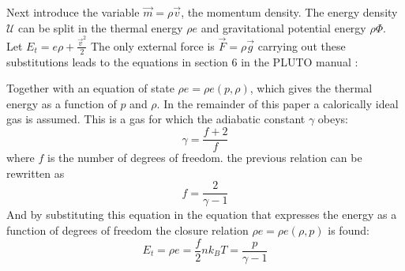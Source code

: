 Next introduce the variable $\vec{m}=\rho \vec{v}$, the momentum density. The energy density $\mathcal{U}$ can be split in the thermal energy $\rho e$ and gravitational potential energy $\rho\Phi$. Let $E_t = e\rho + \frac{\vec{v}^2}{2}$ The only external force is $\vec{F} = \rho\vec{g}$
carrying out these substitutions leads to the equations in section 6 in the PLUTO manual \cite{pluto-manual}: 

{\centering 
\noindent {}
\par}

Together with an equation of state $\rho e = \rho e(p, \rho)$, which gives the thermal energy as a function of $p$ and $\rho$.
In the remainder of this paper a calorically ideal gas is assumed. This is a gas for which the adiabatic constant $\gamma$ obeys:
\begin{equation}
	\gamma = \frac{f+2}{f}
	\label{eq:adiabatic constant}
\end{equation}
where $f$ is the number of degrees of freedom. the previous relation can be rewritten as
\begin{equation*}
	f = \frac{2}{\gamma-1}
\end{equation*}
And by substituting this equation in the equation that expresses the energy as a function of degrees of freedom the closure relation $\rho e= \rho e(\rho, p)$ is found:
\begin{equation*}
	E_t = \rho e = \frac{f}{2}nk_BT = \frac{p}{\gamma-1}
\end{equation*}
